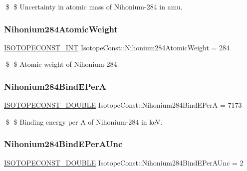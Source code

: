 \$ \$ Uncertainty in atomic mass of Nihonium-\/284 in amu. \mbox{\label{group___isotope_const-_nihonium-_nh284_ga2a2fa0d6844486f48eb2f5d96a7bb65e}} 
\subsubsection{\texorpdfstring{Nihonium284\+Atomic\+Weight}{Nihonium284AtomicWeight}}
{\footnotesize\ttfamily \mbox{\hyperlink{group___isotope_const-_macros_ga5f18360b3e99483a35c32d789e62621c}{I\+S\+O\+T\+O\+P\+E\+C\+O\+N\+S\+T\+\_\+\+I\+NT}} Isotope\+Const\+::\+Nihonium284\+Atomic\+Weight = 284}

\$ \$ Atomic weight of Nihonium-\/284. \mbox{\label{group___isotope_const-_nihonium-_nh284_gae7fe91e5334dd90344cccda4ca379f61}} 
\subsubsection{\texorpdfstring{Nihonium284\+Bind\+E\+PerA}{Nihonium284BindEPerA}}
{\footnotesize\ttfamily \mbox{\hyperlink{group___isotope_const-_macros_ga8f45a7272ce02c0b4c65c44636ed719a}{I\+S\+O\+T\+O\+P\+E\+C\+O\+N\+S\+T\+\_\+\+D\+O\+U\+B\+LE}} Isotope\+Const\+::\+Nihonium284\+Bind\+E\+PerA = 7173}

\$ \$ Binding energy per A of Nihonium-\/284 in keV. \mbox{\label{group___isotope_const-_nihonium-_nh284_ga47234ee263baa282e892dd53c89ac17d}} 
\subsubsection{\texorpdfstring{Nihonium284\+Bind\+E\+Per\+A\+Unc}{Nihonium284BindEPerAUnc}}
{\footnotesize\ttfamily \mbox{\hyperlink{group___isotope_const-_macros_ga8f45a7272ce02c0b4c65c44636ed719a}{I\+S\+O\+T\+O\+P\+E\+C\+O\+N\+S\+T\+\_\+\+D\+O\+U\+B\+LE}} Isotope\+Const\+::\+Nihonium284\+Bind\+E\+Per\+A\+Unc = 2}

